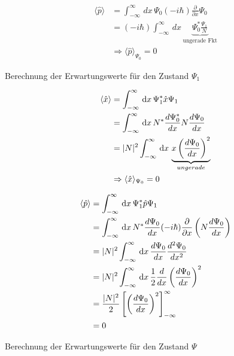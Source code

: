 \begin{align}
    \langle\hat p \rangle &= \int_{-\infty}^{\infty}\,dx\, \Psi _0 (-i\hbar)\frac{\partial}{\partial x} \Psi _0 \\
    &= (-i \hbar)\int_{-\infty}^{\infty}\,dx\, \underbrace{\Psi_0^* \frac{\Psi _1}{N}}_{\text{ungerade Fkt}} \nonumber\\
    &\Rightarrow \langle\hat p\rangle_{\Psi _0} = 0
\end{align}

Berechnung der Erwartungswerte für den Zustand $\Psi _1$

\begin{align}
\langle\hat x\rangle &=\int_{-\infty}^{\infty} \,\mathrm{d}x\, \Psi_1^* \hat x \Psi _1\\
&=\int_{-\infty}^{\infty} \,\mathrm{d}x\, N^* \frac{d\Psi _0^*}{dx} N \frac{d\Psi _0}{dx} \nonumber\\
&=\lvert N\rvert^2 \int_{-\infty}^{\infty} \,\mathrm{d}x\, \underbrace{x \left(\frac{d \Psi _0}{dx} \right)^2}_{ungerade} \nonumber\\
&\Rightarrow \langle\hat x\rangle_{\Psi _0} = 0
\end{align}

\begin{align}
    \langle\hat p \rangle &=\int_{-\infty}^{\infty} \,\mathrm{d}x\, \Psi _1^* \hat p \Psi _1\\
    &= \int_{-\infty}^{\infty} \,\mathrm{d}x\, N^* \frac{d \Psi _0}{dx} (-i\hbar) \frac{\partial}{\partial x}\left(N \frac{d \Psi _0}{dx}\right) \nonumber\\
    &= \lvert N\rvert^2 \int_{-\infty}^{\infty} \,\mathrm{d}x\, \frac{d \Psi _0}{dx} \frac{d^2 \Psi _0}{dx^2} \nonumber\\
    &=\lvert N\rvert^2 \int_{-\infty}^{\infty} \,\mathrm{d}x\, \frac{1}{2} \frac{d}{dx} \left(\frac{d\Psi _0}{dx}\right)^2 \nonumber\\
    &= \frac{\lvert N\rvert^2}{2} \left[ \left(\frac{d\Psi _0}{dx}\right)^2\right]_{-\infty}^{\infty} \nonumber\\
    &=0
\end{align}

Berechnung der Erwartungswerte für den Zustand $\Psi$

